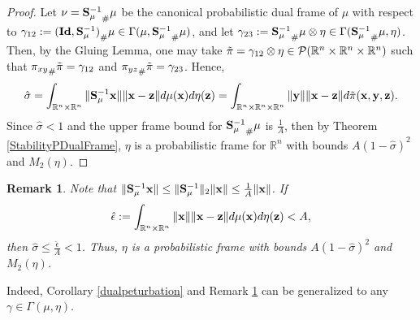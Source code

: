 \documentclass{amsart}
\numberwithin{equation}{section}
\theoremstyle{plain}
\newtheorem{remark}[theorem]{Remark}
\theoremstyle{definition}
\begin{document}
\begin{proof}
Let $ \nu = {{\bf S}_\mu^{-1}}_{\#}\mu$ be the canonical probabilistic dual frame of $\mu$ with respect to $\gamma_{12}:= {({\bf Id}, {\bf S}_\mu^{-1})}_{\#}\mu \in \Gamma(\mu, {{\bf S}_\mu^{-1}}_{\#}\mu)$, and let $\gamma_{23}:= {{\bf S}_\mu^{-1}}_{\#}\mu \otimes \eta \in \Gamma({{\bf S}_\mu^{-1}}_{\#}\mu, \eta)$. Then, by the Gluing Lemma{\cite[pp.~59]{figalli2021invitation}}, one may take $\Tilde{\pi}= \gamma_{12} \otimes \eta \in \mathcal{P}(\mathbb{R}^n \times \mathbb{R}^n \times \mathbb{R}^n)$ such that ${\pi_{xy}}_{\#}\Tilde{\pi} = \gamma_{12}$ and ${\pi_{yz}}_{\#}\Tilde{\pi} = \gamma_{23}$. Hence, 
 \begin{equation*}
     \hat{\sigma}=   \int_{\mathbb{R}^n \times \mathbb{R}^n}  \Vert  {\bf S}_\mu^{-1} {\bf x}\Vert \Vert {\bf x}-{\bf z} \Vert  d \mu({\bf x}) d \eta({\bf z}) = \int_{\mathbb{R}^n \times \mathbb{R}^n \times \mathbb{R}^n}  \Vert {\bf y} \Vert \Vert {\bf x}-{\bf z} \Vert  d \Tilde{\pi}({\bf x},{\bf y},{\bf z}).
 \end{equation*}
Since $\hat{\sigma}<1$ and the upper frame bound for ${{\bf S}_\mu^{-1}}_{\#}\mu$ is $ \frac{1}{A}$,  
then by Theorem \ref{StabilityPDualFrame}, $\eta$ is a probabilistic frame for $\mathbb{R}^n$ with bounds $     A(1- \hat{\sigma})^2$ and $ M_2(\eta)$. 
\end{proof}


\begin{remark}\label{remark1}
Note that $\Vert  {\bf S}_\mu^{-1} {\bf x}\Vert \leq \Vert  {\bf S}_\mu^{-1} \Vert_2 \Vert  {\bf x} \Vert \leq \frac{1}{A} \Vert  {\bf x} \Vert$. If 
 \begin{equation*}
     \hat{ \epsilon}:=   \int_{\mathbb{R}^n \times \mathbb{R}^n} \Vert {\bf x}\Vert   \Vert {\bf x}-{\bf z} \Vert d \mu({\bf x}) d \eta({\bf z})<A,
 \end{equation*}
 then $\hat{\sigma} \leq \frac{\hat{\epsilon}}{A}<1$. Thus, $\eta$ is a probabilistic frame with bounds $A(1- \hat{\sigma})^2 $ and $ M_2(\eta)$. 
\end{remark}


Indeed, Corollary \ref{dualpeturbation} and Remark \ref{remark1} can be generalized to any $\gamma \in \Gamma(\mu, \eta)$.
\end{document}

